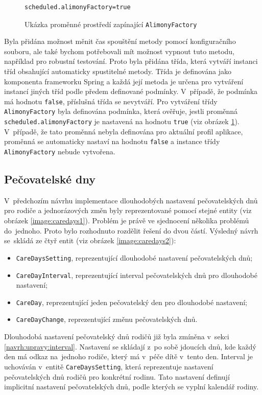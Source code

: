             \begin{figure}
                \begin{verbatim}
scheduled.alimonyFactory=true
                \end{verbatim}
                \caption{Ukázka proměnné prostředí zapínající \texttt{AlimonyFactory}} 
                \label{code:alimony-factory-true}
            \end{figure}
            Byla přidána možnost měnit čas spouštění metody pomocí konfiguračního souboru, ale také bychom potřebovali mít možnost vypnout tuto metodu, například pro robustní testování. Proto byla přidána třída, která vytváří instanci tříd obsahující automaticky spustitelné metody. Třída je definována jako komponenta frameworku Spring a každá její metoda je určena pro vytváření instancí jiných tříd podle předem definované podmínky.
            V~případě, že podmínka má hodnotu \verb|false|, příslušná třída se nevytváří.
            Pro vytváření třídy \verb|AlimonyFactory| byla definována podmínka, která ověřuje, jestli proměnná \verb|scheduled.alimonyFactory| je nastavená na hodnotu \verb|true| (viz obrázek \ref{code:alimony-factory-true}). V~případě, že tato proměnná nebyla definována pro aktuální profil aplikace, proměnná se automaticky nastaví na hodnotu \verb|false| a instance třídy \verb|AlimonyFactory| nebude vytvořena.
        
    \subsection{Pečovatelské dny}\label{navrh:upravy:caredays} %
        V~předchozím návrhu implementace dlouhodobých nastavení pečovatelských dnů pro rodiče a jednorázových změn byly reprezentované pomocí stejné entity (viz obrázek \ref{image:caredays1}). Problém je právě ve sjednocení několika problémů do~jednoho. Proto bylo rozhodnuto rozdělit řešení do dvou částí. Výsledný návrh se~skládá ze čtyř entit (viz obrázek \ref{image:caredays2}):
        \begin{itemize}
            \item \texttt{CareDaysSetting}, reprezentující dlouhodobé nastavení pečovatelských dnů;
            \item \texttt{CareDayInterval}, reprezentující interval pečovatelských dnů pro dlouhodobé nastavení;
            \item \texttt{CareDay}, reprezentující jeden pečovatelský den pro dlouhodobé nastavení;
            \item \texttt{CareDayChange}, reprezentující změnu pečovatelských dnů.
        \end{itemize}
        Dlouhodobá nastavení pečovatelský dnů rodičů již byla zmíněna v~sekci \ref{navrh:upravy:interval}. Nastavení se skládají z~po sobě jdoucích dnů, kde každý den má odkaz na~jednoho rodiče, který má v~péče dítě v~tento den. Interval je uchováván v~entitě \verb|CareDaysSetting|, která reprezentuje nastavení pečovatelských dnů rodičů pro konkrétní rodinu. Tato nastavení definují implicitní nastavení pečovatelských dnů, podle kterých se vyplní kalendář rodiny.
        
